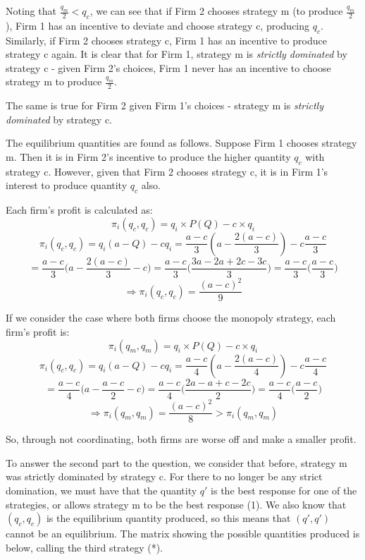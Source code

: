 \documentclass[11pt,a4paper]{article}
\begin{document}
Noting that $\frac{q_m}{2} < q_c$, we can see that if Firm 2 chooses strategy m (to produce $\frac{q_m}{2}$), Firm 1 has an incentive to deviate and choose strategy c, producing $q_c$. Similarly, if Firm 2 chooses strategy c, Firm 1 has an incentive to produce strategy c again. It is clear that for Firm 1, strategy m is \textit{strictly dominated} by strategy c - given Firm 2's choices, Firm 1 never has an incentive to choose strategy m to produce $\frac{q_m}{2}$.

The same is true for Firm 2 given Firm 1's choices - strategy m is \textit{strictly dominated} by strategy c.

The equilibrium quantities are found as follows. Suppose Firm 1 chooses strategy m. Then it is in Firm 2's incentive to produce the higher quantity $q_c$ with strategy c. However, given that Firm 2 chooses strategy c, it is in Firm 1's interest to produce quantity $q_c$ also.

Each firm's profit is calculated as: $$\pi_i (q_c, q_c) = q_i \times P(Q) - c\times q_i $$
$$ \pi_i (q_c, q_c) = q_i(a-Q)-cq_i = \frac{a-c}{3}(a-\frac{2(a-c)}{3})-c\frac{a-c}{3}$$
$$ = \frac{a-c}{3}\Big(a-\frac{2(a-c)}{3}-c\Big) = \frac{a-c}{3}\Big(\frac{3a-2a+2c-3c}{3}\Big) = \frac{a-c}{3}\Big(\frac{a-c}{3}\Big)$$
$$ \Rightarrow \pi_i (q_c, q_c) = \frac{(a-c)^2}{9}$$

If we consider the case where both firms choose the monopoly strategy, each firm's profit is:
$$\pi_i (q_m, q_m) = q_i \times P(Q) - c\times q_i $$
$$ \pi_i (q_c, q_c) = q_i(a-Q)-cq_i = \frac{a-c}{4}(a-\frac{2(a-c)}{4})-c\frac{a-c}{4}$$
$$ = \frac{a-c}{4}\Big(a-\frac{a-c}{2}-c\Big) = \frac{a-c}{4}\Big(\frac{2a-a+c-2c}{2}\Big) = \frac{a-c}{4}\Big(\frac{a-c}{2}\Big)$$
$$ \Rightarrow \pi_i (q_m, q_m) = \frac{(a-c)^2}{8} > \pi_i (q_m, q_m)$$

So, through not coordinating, both firms are worse off and make a smaller profit. 

To answer the second part to the question, we consider that before, strategy m was strictly dominated by strategy c. For there to no longer be any strict domination, we must have that the quantity $q'$ is the best response for one of the strategies, or allows strategy m to be the best response (1). We also know that $(q_c, q_c)$ is the equilibrium quantity produced, so this means that $(q',q')$ cannot be an equilibrium.
The matrix showing the possible quantities produced is below, calling the third strategy (*).
\end{document}
